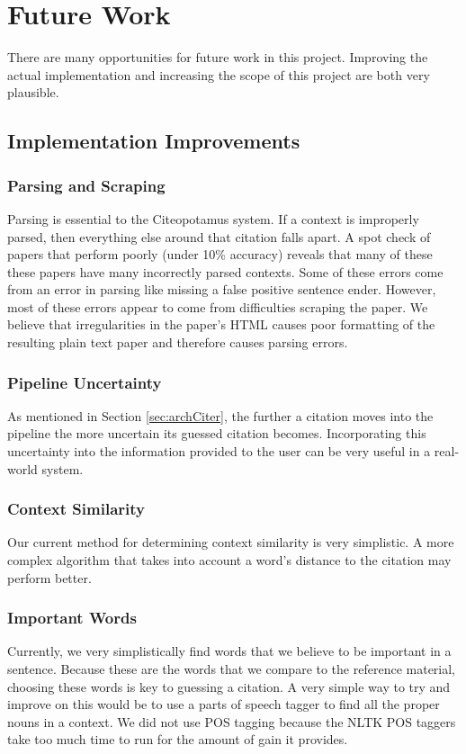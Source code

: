\documentclass[10pt, conference, compsocconf]{IEEEtran}
\begin{document}
\section{Future Work}\label{sec:future}
There are many opportunities for future work in this project.
Improving the actual implementation and increasing the scope of this project are both very plausible.

\subsection{Implementation Improvements}

\subsubsection{Parsing and Scraping}
Parsing is essential to the Citeopotamus system. If a context is improperly parsed, then everything else around that citation falls apart.
A spot check of papers that perform poorly (under 10\% accuracy) reveals that many of these these papers have many incorrectly parsed contexts.
Some of these errors come from an error in parsing like missing a false positive sentence ender. However, most of these errors appear to
come from difficulties scraping the paper. We believe that irregularities in the paper's HTML causes poor formatting of the resulting
plain text paper and therefore causes parsing errors.

\subsubsection{Pipeline Uncertainty}
As mentioned in Section \ref{sec:archCiter}, the further a citation moves into the pipeline the more uncertain its guessed citation becomes.
Incorporating this uncertainty into the information provided to the user can be very useful in a real-world system.

\subsubsection{Context Similarity}
Our current method for determining context similarity is very simplistic. A more complex algorithm that takes into account a word's distance to the
citation may perform better.

\subsubsection{Important Words}
Currently, we very simplistically find words that we believe to be important in a sentence. Because these are the words that
we compare to the reference material, choosing these words is key to guessing a citation. A very simple way to try and improve on this
would be to use a parts of speech tagger to find all the proper nouns in a context. We did not use POS tagging because
the NLTK POS taggers take too much time to run for the amount of gain it provides.
\end{document}
